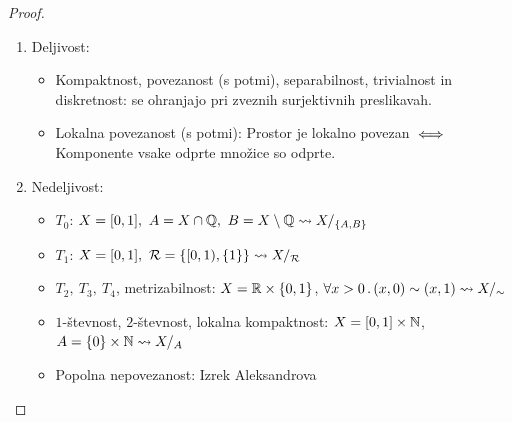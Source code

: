 \begin{proof} \
    \begin{enumerate}
        \item Deljivost:
        \begin{itemize}
            \item Kompaktnost, povezanost (s potmi), separabilnost, trivialnost in diskretnost: se ohranjajo pri zveznih surjektivnih preslikavah.
            \item Lokalna povezanost (s potmi): Prostor je lokalno povezan \(\iff\) Komponente vsake odprte množice so odprte. 
        \end{itemize}
        \item Nedeljivost:
        \begin{itemize}
            \item \(T_0\): \(X=[0,1], \ A = X \cap \mathbb{Q}, \ B = X \setminus \mathbb{Q} \leadsto X/_{\left\{A, B\right\}}\)
            \item \(T_1\): \(X=[0,1], \ \mathcal{R} = \left\{[0,1), \left\{1\right\}\right\} \leadsto X/_\mathcal{R}\)
            \item \(T_2, \ T_3, \ T_4\), metrizabilnost: \(X = \mathbb{R} \times \left\{0,1\right\}\), \(\forall x > 0 \,.\,(x, 0) \sim (x, 1) \leadsto X/_\sim\)
            \item \(1\)-števnost, \(2\)-števnost, lokalna kompaktnost: \(X=[0,1] \times \mathbb{N}\), \(A = \left\{0\right\} \times \mathbb{N} \leadsto X/_A\)
            \item Popolna nepovezanost: Izrek Aleksandrova \qedhere
        \end{itemize}
    \end{enumerate}    
\end{proof}